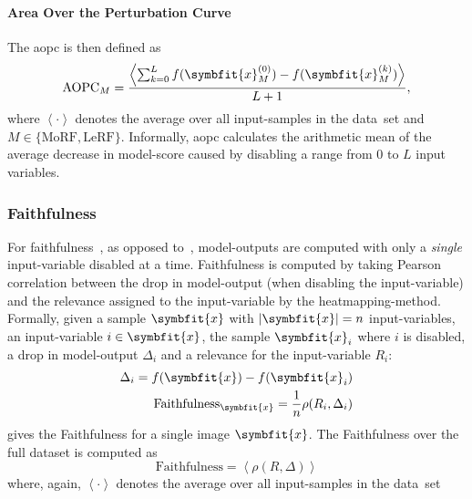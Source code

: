 \paragraph{Area Over the Perturbation Curve}
The \gls{aopc} is then defined as
\[
    \text{AOPC}_M = \dfrac{\left< \sum_{k=0}^{L} f(\symbfit{x}^{(0)}_{M}) - f(\symbfit{x}^{(k)}_{M}) \right>}{L+1},
\]
where \(\left< \cdot \right>\) denotes the average over all input-samples in the \mbox{data set} and \(M \in \{\text{MoRF}, \text{LeRF}\}\). Informally, \gls{aopc} calculates the arithmetic mean of the average decrease in model-score caused by disabling a range from \(0\) to \(L\) input variables.

\subsubsection{Faithfulness}\label{metrics:faithfulness}
For faithfulness~\cite{AlvarezMelis.2018, Tomsett.2019}, as opposed to~, model-outputs are computed with only a \textit{single} input-variable disabled at a time. Faithfulness is computed by taking Pearson correlation between the drop in model-output (when disabling the input-variable) and the relevance assigned to the input-variable by the heatmapping-method. Formally, given a sample \(\symbfit{x}\) with \(\left|\symbfit{x}\right|=n\) input-variables, an input-variable \(i\in \symbfit{x}\), the sample \(\symbfit{x}_i\) where \(i\) is disabled, a drop in model-output \(\Delta_i\) and a relevance for the input-variable \(R_i\):
\begin{align*}
    \Delta_i = f(\symbfit{x}) - f(\symbfit{x}_i)\\
    \text{Faithfulness}_{\symbfit{x}} = \frac{1}{n} \rho(R_i, \Delta_i)
\end{align*}
gives the Faithfulness for a single image \(\symbfit{x}\). The Faithfulness over the full dataset is computed as
\[
    \text{Faithfulness} = \left<\rho(R, \Delta)\right>
\]
where, again, \(\left< \cdot \right>\) denotes the average over all input-samples in the \mbox{data set}


